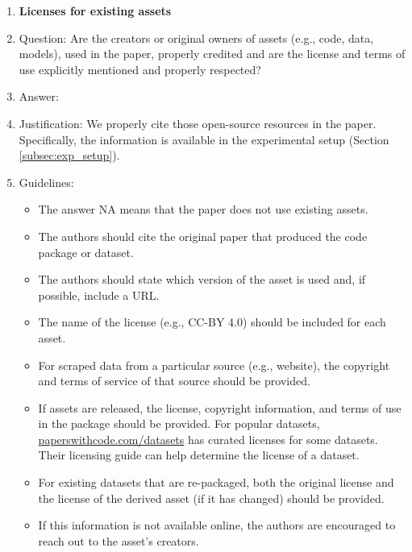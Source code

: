 \documentclass{article}
\theoremstyle{plain}
\theoremstyle{definition}
\theoremstyle{remark}
\begin{document}
\begin{enumerate}
\item {\bf Licenses for existing assets}
    \item[] Question: Are the creators or original owners of assets (e.g., code, data, models), used in the paper, properly credited and are the license and terms of use explicitly mentioned and properly respected?
    \item[] Answer: \answerYes{} %
    \item[] Justification: We properly cite those open-source resources in the paper. Specifically, the information is available in the experimental setup (Section \ref{subsec:exp_setup}). 
    \item[] Guidelines:
    \begin{itemize}
        \item The answer NA means that the paper does not use existing assets.
        \item The authors should cite the original paper that produced the code package or dataset.
        \item The authors should state which version of the asset is used and, if possible, include a URL.
        \item The name of the license (e.g., CC-BY 4.0) should be included for each asset.
        \item For scraped data from a particular source (e.g., website), the copyright and terms of service of that source should be provided.
        \item If assets are released, the license, copyright information, and terms of use in the package should be provided. For popular datasets, \url{paperswithcode.com/datasets} has curated licenses for some datasets. Their licensing guide can help determine the license of a dataset.
        \item For existing datasets that are re-packaged, both the original license and the license of the derived asset (if it has changed) should be provided.
        \item If this information is not available online, the authors are encouraged to reach out to the asset's creators.
    \end{itemize}


\end{enumerate}
\end{document}
